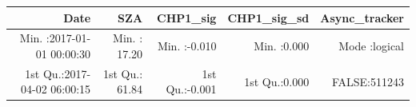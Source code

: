 \documentclass[
  10pt,
  a4paper,oneside]{article}
\begin{document}
\begin{longtable}[]{@{}rrrrr@{}}
\toprule
\begin{minipage}[b]{0.27\columnwidth}\raggedleft
Date\strut
\end{minipage} & \begin{minipage}[b]{0.15\columnwidth}\raggedleft
SZA\strut
\end{minipage} & \begin{minipage}[b]{0.15\columnwidth}\raggedleft
CHP1\_sig\strut
\end{minipage} & \begin{minipage}[b]{0.14\columnwidth}\raggedleft
CHP1\_sig\_sd\strut
\end{minipage} & \begin{minipage}[b]{0.14\columnwidth}\raggedleft
Async\_tracker\strut
\end{minipage}\tabularnewline
\midrule
\endhead
\begin{minipage}[t]{0.27\columnwidth}\raggedleft
Min. :2017-01-01 00:00:30\strut
\end{minipage} & \begin{minipage}[t]{0.15\columnwidth}\raggedleft
Min. : 17.20\strut
\end{minipage} & \begin{minipage}[t]{0.15\columnwidth}\raggedleft
Min. :-0.010\strut
\end{minipage} & \begin{minipage}[t]{0.14\columnwidth}\raggedleft
Min. :0.000\strut
\end{minipage} & \begin{minipage}[t]{0.14\columnwidth}\raggedleft
Mode :logical\strut
\end{minipage}\tabularnewline
\begin{minipage}[t]{0.27\columnwidth}\raggedleft
1st Qu.:2017-04-02 06:00:15\strut
\end{minipage} & \begin{minipage}[t]{0.15\columnwidth}\raggedleft
1st Qu.: 61.84\strut
\end{minipage} & \begin{minipage}[t]{0.15\columnwidth}\raggedleft
1st Qu.:-0.001\strut
\end{minipage} & \begin{minipage}[t]{0.14\columnwidth}\raggedleft
1st Qu.:0.000\strut
\end{minipage} & \begin{minipage}[t]{0.14\columnwidth}\raggedleft
FALSE:511243\strut
\end{minipage}\tabularnewline

\end{longtable}
\end{document}
